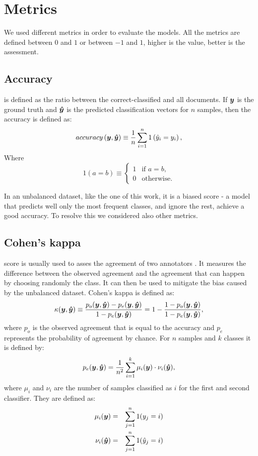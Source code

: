 \section{Metrics}\label{sec:metrics}
We used different metrics in order to evaluate the models.
All the metrics are defined between $0$ and $1$ or between $-1$ and $1$,
higher is the value, better is the assessment.

\subsection{Accuracy}
is defined
as the ratio between the correct-classified and all documents. If $\bm{y}$
is the ground truth and $\bm{\hat y}$ is the predicted
classification vectors for $n$ samples, then the accuracy is defined
as:
\begin{equation*}
  accuracy\left(\bm{y}, \bm{\hat y}\right) \equiv
  \frac{1}{n}\sum_{i=1}^{n} 1\left(\hat y_i = y_i\right),
\end{equation*}
Where
\begin{equation*}
  1(a = b)\equiv
  \begin{cases}
    1 & \text{if }a = b,\\
    0 & \text{otherwise}.
  \end{cases}
\end{equation*}

In an
unbalanced dataset, like the one of this work, it is a biased score -
a model that predicts well only the most frequent classes, and ignore
the rest, achieve a good accuracy. To resolve this we considered also
other metrics.

\subsection{Cohen's kappa} score is usually used to asses
the agreement of two annotators \cite{cohen_coefficient_1960}. It
measures the difference between the observed agreement and the
agreement that can happen by choosing randomly the class. It can then
be used to mitigate the bias caused by the unbalanced dataset. Cohen's
kappa is defined as:
\begin{equation*}
  \kappa(\bm{y}, \bm{\hat y})\equiv \frac{p_o(\bm{y}, \bm{\hat y}) -p_e(\bm{y}, \bm{\hat y})}{1-p_e(\bm{y}, \bm{\hat y})} = 1-\frac{1-p_o(\bm{y}, \bm{\hat y})}{1-p_e(\bm{y}, \bm{\hat y})},
\end{equation*}
where $p_o$ is the observed agreement that is equal to the accuracy
and $p_e$ represents the probability of agreement by chance. For $n$
samples and $k$ classes it is
defined by:
\begin{equation*}
  p_e(\bm{y}, \bm{\hat y}) = \frac{1}{n^2}\sum_{i=1}^{k} \mu_{i}(\bm{y})\cdot\nu_{i}(\bm{\hat y}),
\end{equation*}
where $\mu_{i}$ and $\nu_{i}$ are the number of samples classified as
$i$ for the first and second classifier. They are defined as:
\begin{eqnarray*}
  \mu_i(\bm{y}) &=& \sum_{j=1}^{n}1(y_j = i)\\
  \nu_i(\bm{\hat y}) &=& \sum_{j=1}^{n}1(\hat y_j = i)
\end{eqnarray*}


